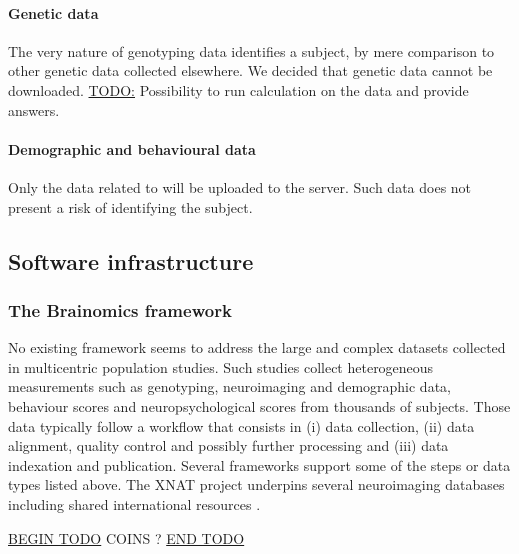 \documentclass[review]{elsarticle}
\begin{document}
\paragraph{Genetic data} The very nature of genotyping data identifies a subject, by mere comparison to other genetic data collected elsewhere. We decided that genetic data cannot be downloaded. \underline{TODO:} Possibility to run calculation on the data and provide answers.

\paragraph{Demographic and behavioural data} Only the data related to \cite{Pinel2007}
will be uploaded to the server. Such data does not present a risk of identifying the subject.


\subsection{Software infrastructure}

\subsubsection{The Brainomics framework}

No existing framework seems to address the large and complex datasets collected in multicentric population studies. Such studies collect heterogeneous measurements such as genotyping, neuroimaging and demographic data, behaviour scores and neuropsychological scores from thousands of subjects. Those data typically follow a workflow that consists in (i) data collection, (ii) data alignment, quality control and possibly further processing and (iii) data indexation and publication. Several frameworks support some of the steps or data types listed above. The XNAT project \cite{XNAT2007} underpins several neuroimaging databases including shared international resources \cite{HBP2012}.

\underline{BEGIN TODO}
COINS ?
\underline{END TODO}
\end{document}
